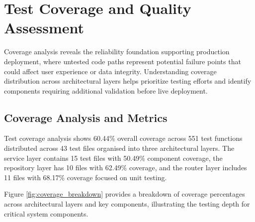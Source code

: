 
\section{Test Coverage and Quality Assessment} \label{section:test_coverage_quality}

Coverage analysis reveals the reliability foundation supporting production deployment, where untested code paths represent potential failure points that could affect user experience or data integrity. Understanding coverage distribution across architectural layers helps prioritize testing efforts and identify components requiring additional validation before live deployment.

\subsection{Coverage Analysis and Metrics} \label{subsection:coverage_analysis}

Test coverage analysis shows 60.44\% overall coverage across 551 test functions distributed across 43 test files organised into three architectural layers. The service layer contains 15 test files with 50.49\% component coverage, the repository layer has 10 files with 62.49\% coverage, and the router layer includes 11 files with 68.17\% coverage focused on unit testing.

Figure \ref{fig:coverage_breakdown} provides a breakdown of coverage percentages across architectural layers and key components, illustrating the testing depth for critical system components.

